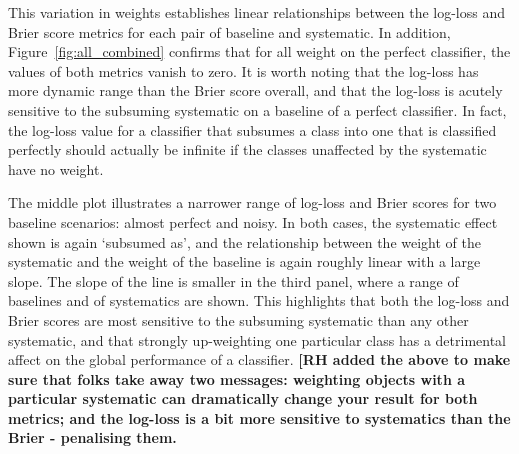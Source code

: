This variation in weights establishes linear relationships between the log-loss and Brier score metrics for each pair of baseline and systematic. In addition, Figure~\ref{fig:all_combined} confirms that for all weight on the perfect classifier, the values of both metrics vanish to zero. It is worth noting that the log-loss has more dynamic range than the Brier score overall, and that the log-loss is acutely sensitive to the subsuming systematic on a baseline of a perfect classifier. In fact, the log-loss value for a classifier that subsumes a class into one that is classified perfectly should actually be infinite if the classes unaffected by the systematic have no weight.

The middle plot illustrates a narrower range of log-loss and Brier scores for two baseline scenarios: almost perfect and noisy.
In both cases, the systematic effect shown is again `subsumed as', and the relationship between the weight of the systematic and the weight of the baseline is again roughly linear with a large slope. 
The slope of the line is smaller in the third panel, where a range of baselines and of systematics are shown. This highlights that both the log-loss and Brier scores are most sensitive to the subsuming systematic than any other systematic, and that strongly up-weighting one particular class has a detrimental affect on the global performance of a classifier.
\textbf{[RH added the above to make sure that folks take away two messages: weighting objects with a particular systematic can dramatically change your result for both metrics; and the log-loss is a bit more sensitive to systematics than the Brier - penalising them.}






